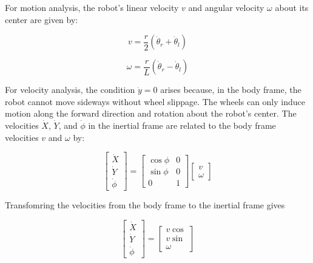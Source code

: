 \noindent For motion analysis, the robot’s linear velocity \( v \) and angular velocity \( \omega \) about its center are given by:

\begin{equation}
v = \frac{r}{2} \left( \dot{\theta}_r + \dot{\theta}_l \right)
\label{eq:linear_velocity}
\end{equation}

\vspace{-0.25em}

\begin{equation}
\omega = \frac{r}{L} \left( \dot{\theta}_r - \dot{\theta}_l \right)
\label{eq:angular_velocity}
\end{equation}


\noindent For velocity analysis, the condition $\dot{y} = 0$ arises because, in the body frame, the robot cannot move sideways without wheel slippage. The wheels can only induce motion along the forward direction and rotation about the robot's center.
The velocities \( \dot{X} \), \( \dot{Y} \), and \( \dot{\phi} \) in the inertial frame are related to the body frame velocities \( v \) and \( \omega \) by:

\begin{equation}
\begin{bmatrix} \dot{X} \\ \dot{Y} \\ \dot{\phi} \end{bmatrix}
=
\begin{bmatrix} \cos \phi & 0 \\ \sin \phi & 0 \\ 0 & 1 \end{bmatrix}
\begin{bmatrix} v \\ \omega \end{bmatrix}
\label{eq:transformation}
\end{equation}


\noindent Transfomring the velocities from the body frame to the inertial frame gives

\begin{equation}
    \begin{bmatrix} \dot{X} \\ \dot{Y} \\ \dot{\phi} \end{bmatrix}
    =
    \begin{bmatrix} v\cos \\v\sin \\ \omega \end{bmatrix}
    \label{eq:transformation2}
\end{equation}
    



